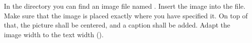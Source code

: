In the  directory you can find an image file named 
. Insert the image into the 
 file. Make sure that the image is placed 
exactly where you have specified it. On top of that, the picture shall be 
centered, and a caption shall be added. Adapt the image width to the text width 
().


